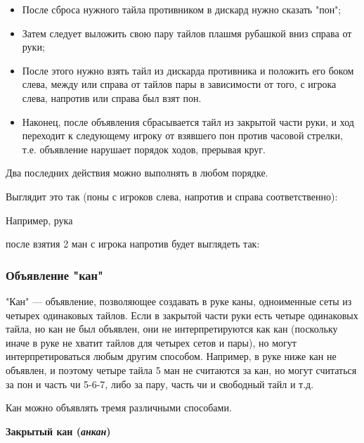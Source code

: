 \begin{itemize}
	\item После сброса нужного тайла противником в дискард нужно сказать "пон";
	\item Затем следует выложить свою пару тайлов плашмя рубашкой вниз справа от руки;
	\item После этого нужно взять тайл из дискарда противника и положить его боком слева, между или справа от тайлов пары в зависимости от того, с игрока слева, напротив или справа был взят пон. 
	\item Наконец, после объявления сбрасывается тайл из закрытой части руки, и ход переходит к следующему игроку от взявшего пон против часовой стрелки, т.е. объявление нарушает порядок ходов, прерывая круг.
\end{itemize}
Два последних действия можно выполнять в любом порядке.

Выглядит это так (поны с игроков слева, напротив и справа соответственно):

\begin{additional}

Например, рука


после взятия 2 ман с игрока напротив будет выглядеть так:

 \hfill {}

\end{additional}



\subsubsection{Объявление "кан"}

"Кан" --- объявление, позволяющее создавать в руке каны, одноименные сеты из четырех одинаковых тайлов. Если в закрытой части руки есть четыре одинаковых тайла, но кан не был объявлен, они не интерпретируются как кан (поскольку иначе в руке не хватит тайлов для четырех сетов и пары), но могут интерпретироваться любым другим способом. Например, в руке ниже кан не объявлен, и поэтому четыре тайла 5 ман не считаются за кан, но могут считаться за пон и часть чи 5-6-7, либо за пару, часть чи и свободный тайл и т.д.


Кан можно объявлять тремя различными способами.

\textbf{Закрытый кан (\textit{анкан})}

